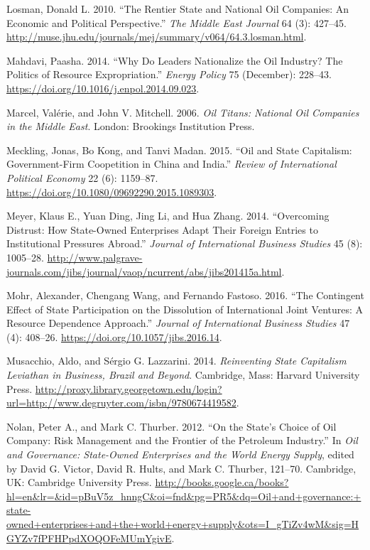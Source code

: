 \documentclass[11pt,]{book}
\begin{document}
\leavevmode\hypertarget{ref-losman_rentier_2010}{}%
Losman, Donald L. 2010. ``The Rentier State and National Oil Companies: An Economic and Political Perspective.'' \emph{The Middle East Journal} 64 (3): 427--45. \url{http://muse.jhu.edu/journals/mej/summary/v064/64.3.losman.html}.

\leavevmode\hypertarget{ref-mahdavi_why_2014}{}%
Mahdavi, Paasha. 2014. ``Why Do Leaders Nationalize the Oil Industry? The Politics of Resource Expropriation.'' \emph{Energy Policy} 75 (December): 228--43. \url{https://doi.org/10.1016/j.enpol.2014.09.023}.

\leavevmode\hypertarget{ref-marcel_oil_2006}{}%
Marcel, Valérie, and John V. Mitchell. 2006. \emph{Oil Titans: National Oil Companies in the Middle East}. London: Brookings Institution Press.

\leavevmode\hypertarget{ref-meckling_oil_2015}{}%
Meckling, Jonas, Bo Kong, and Tanvi Madan. 2015. ``Oil and State Capitalism: Government-Firm Coopetition in China and India.'' \emph{Review of International Political Economy} 22 (6): 1159--87. \url{https://doi.org/10.1080/09692290.2015.1089303}.

\leavevmode\hypertarget{ref-meyer_overcoming_2014}{}%
Meyer, Klaus E., Yuan Ding, Jing Li, and Hua Zhang. 2014. ``Overcoming Distrust: How State-Owned Enterprises Adapt Their Foreign Entries to Institutional Pressures Abroad.'' \emph{Journal of International Business Studies} 45 (8): 1005--28. \url{http://www.palgrave-journals.com/jibs/journal/vaop/ncurrent/abs/jibs201415a.html}.

\leavevmode\hypertarget{ref-mohr_contingent_2016}{}%
Mohr, Alexander, Chengang Wang, and Fernando Fastoso. 2016. ``The Contingent Effect of State Participation on the Dissolution of International Joint Ventures: A Resource Dependence Approach.'' \emph{Journal of International Business Studies} 47 (4): 408--26. \url{https://doi.org/10.1057/jibs.2016.14}.

\leavevmode\hypertarget{ref-musacchio_reinventing_2014}{}%
Musacchio, Aldo, and Sérgio G. Lazzarini. 2014. \emph{Reinventing State Capitalism Leviathan in Business, Brazil and Beyond}. Cambridge, Mass: Harvard University Press. \url{http://proxy.library.georgetown.edu/login?url=http://www.degruyter.com/isbn/9780674419582}.

\leavevmode\hypertarget{ref-victor_states_2012}{}%
Nolan, Peter A., and Mark C. Thurber. 2012. ``On the State's Choice of Oil Company: Risk Management and the Frontier of the Petroleum Industry.'' In \emph{Oil and Governance: State-Owned Enterprises and the World Energy Supply}, edited by David G. Victor, David R. Hults, and Mark C. Thurber, 121--70. Cambridge, UK: Cambridge University Press. \url{http://books.google.ca/books?hl=en\&lr=\&id=pBuV5z_hnngC\&oi=fnd\&pg=PR5\&dq=Oil+and+governance:+state-owned+enterprises+and+the+world+energy+supply\&ots=I_gTiZv4wM\&sig=HGYZv7fPFHPpdXOQOFeMUmYgivE}.
\end{document}
